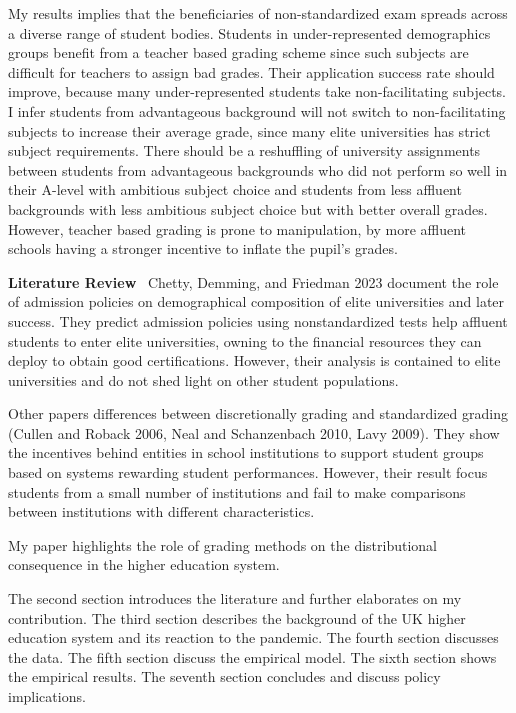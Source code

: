 My results implies that the beneficiaries of non-standardized exam spreads across a diverse range of student bodies. Students in under-represented demographics groups benefit from a teacher based grading scheme since such subjects are difficult for teachers to assign bad grades. Their application success rate should improve, because many under-represented students take non-facilitating subjects. I infer students from advantageous background will not switch to non-facilitating subjects to increase their average grade, since many elite universities has strict subject requirements. There should be a reshuffling of university assignments between students from advantageous backgrounds who did not perform so well in their A-level with ambitious subject choice and students from less affluent backgrounds with less ambitious subject choice but with better overall grades. However, teacher based grading is prone to manipulation, by more affluent schools having a stronger incentive to inflate the pupil's grades. 

\vspace{1em}


\textbf{Literature Review}  \ Chetty, Demming, and Friedman 2023 document the role of admission policies on demographical composition of elite universities and later success. They predict admission policies using nonstandardized tests help affluent students to enter elite universities, owning to the financial resources they can deploy to obtain good certifications. However, their analysis is contained to elite universities and do not shed light on other student populations. 

Other papers differences between discretionally grading and standardized grading (Cullen and Roback 2006, Neal and Schanzenbach 2010, Lavy 2009). They show the incentives behind entities in school institutions to support student groups based on systems rewarding student performances. However, their result focus students from a small number of institutions and fail to make comparisons between institutions with different characteristics. 

My paper highlights the role of grading methods on the distributional consequence in the higher education system.

The second section introduces the literature and further elaborates on my contribution. The third section describes the background of the UK higher education system and its reaction to the pandemic. The fourth section discusses the data. The fifth section discuss the empirical model. The sixth section shows the empirical results. The seventh section concludes and discuss policy implications.
